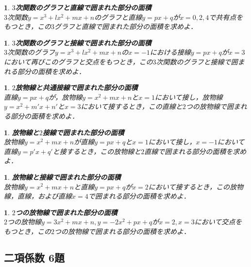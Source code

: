 \documentclass[10pt,
fleqn,
dvipdfmx,
uplatex
]{jsarticle}
\newtheorem{question}[Question]{}
\begin{document}
\begin{question}{\bf\boldmath $3$次関数のグラフと直線で囲まれた部分の面積}\\
$3$次関数$y=x^3+lx^2+mx+n$のグラフと直線$y=px+q$が$x=0,2,4$で共有点をもつとき，この$3$グラフと直線で囲まれた部分の面積を求めよ．
\end{question}



\begin{question}{\bf\boldmath $3$次関数のグラフと接線で囲まれた部分の面積}\\
$3$次関数のグラフ$y=x^3+lx^2+mx+n$の$x=-1$における接線$y=px+q$が$x=3$において再びこのグラフと交点をもつとき，この$3$次関数のグラフと接線で囲まれる部分の面積を求めよ．
\end{question}



\begin{question}{\bf\boldmath $2$放物線と共通接線で囲まれた部分の面積}\\
直線$y=px+q$が，放物線$y=x^2+mx+n$と$x=1$において接し，放物線$y=x^2+m'x+n'$と$x=3$において接するとき，この直線と$2$つの放物線で囲まれる部分の面積を求めよ．
\end{question}



\begin{question}{\bf\boldmath 放物線と$2$接線で囲まれた部分の面積}\\
放物線$y=x^2+mx+n$が直線$y=px+q$と$x=1$において接し，$x=-1$において直線$y=p'x+q'$と接するとき，この放物線と$2$直線で囲まれる部分の面積を求めよ．
\end{question}



\begin{question}{\bf\boldmath 放物線と接線で囲まれた部分の面積}\\
放物線$y=x^2+mx+n$と直線$y=px+q$が$x=2$において接するとき，この放物線，直線，および直線$x=4$で囲まれる部分の面積を求めよ．
\end{question}



\begin{question}{\bf\boldmath $2$つの放物線で囲まれた部分の面積}\\
$2$つの放物線$y=3x^2+mx+n, y=-2x^2+px+q$が$x=2, x=3$において交点をもつとき，この$2$つの放物線で囲まれる部分の面積を求めよ．
\end{question}

\subsection{二項係数 6題}
\end{document}
